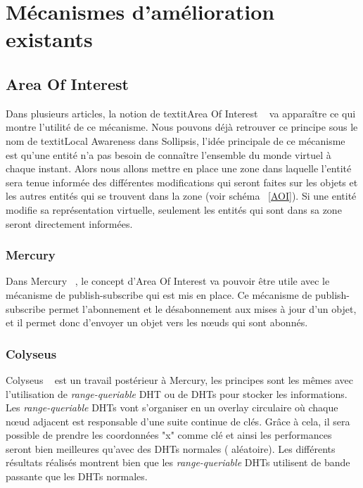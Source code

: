 \section{Mécanismes d'amélioration existants}
	\subsection{Area Of Interest}
	Dans plusieurs articles, la notion de textit{Area Of Interest} ~\cite{1403002,1267692,1015507} va apparaître ce qui montre l'utilité de ce mécanisme. Nous pouvons déjà retrouver ce principe sous le nom de textit{Local Awareness} dans Sollipsis, l'idée principale de ce mécanisme est qu'une entité n'a pas besoin de connaître l'ensemble du monde virtuel à chaque instant. Alors nous allons mettre en place une zone dans laquelle l'entité sera tenue informée des différentes modifications qui seront faites sur les objets et les autres entités qui se trouvent dans la zone (voir schéma ~\ref{AOI}). Si une entité modifie sa représentation virtuelle, seulement les entités qui sont dans sa zone seront directement informées.\\

	\subsubsection{Mercury}
	Dans Mercury ~\cite{1015507}, le concept d'Area Of Interest va pouvoir être utile avec le mécanisme de publish-subscribe qui est mis en place. Ce mécanisme de publish-subscribe permet l'abonnement et le désabonnement aux mises à jour d'un objet, et il permet donc d'envoyer un objet vers les nœuds qui sont abonnés.\\
	\subsubsection{Colyseus}
	Colyseus ~\cite{1267692} est un travail postérieur à Mercury, les principes sont les mêmes avec l'utilisation de \textit{range-queriable} DHT ou de DHTs pour stocker les informations. Les \textit{range-queriable} DHTs vont s'organiser en un overlay circulaire où chaque nœud adjacent est responsable d'une suite continue de clés. Grâce à cela, il sera possible de prendre les coordonnées "x" comme clé et ainsi les performances seront bien meilleures qu'avec des DHTs normales ( aléatoire). Les différents résultats réalisés montrent bien que les \textit{range-queriable} DHTs utilisent de bande passante que les DHTs normales. \\
